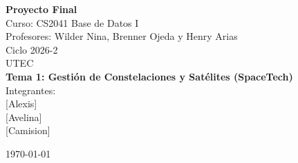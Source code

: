 \begin{titlepage}
    \centering
    \vspace*{2cm}
    
    {\Huge \textbf{Proyecto Final}} \\[0.5cm]
    {\LARGE Curso: CS2041 Base de Datos I} \\[1cm]
    
    {\Large Profesores: Wilder Nina, Brenner Ojeda y Henry Arias} \\[1cm]
    {\Large Ciclo 2026-2} \\[1cm]
    {\Large UTEC} \\[2cm]
    
    {\huge \textbf{Tema 1: Gestión de Constelaciones y Satélites (SpaceTech)}} \\[1.5cm]
    
    {\Large Integrantes:} \\
    {\large [Alexis]} \\
    {\large [Avelina]} \\[2cm]
    {\large [Camision]} \\[2cm]
    
    \vfill
    
    {\large \today}
    
\end{titlepage}
